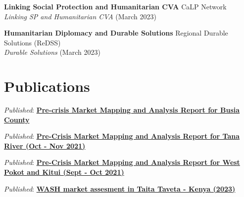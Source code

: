 \documentclass[line,margin,10pt]{res}
\begin{document}
\begin{resume}
\textbf{Linking Social Protection and Humanitarian CVA } \hfill CaLP Network\\
{\sl Linking SP and Humanitarian CVA} \hfill (March 2023)

\textbf{Humanitarian Diplomacy and Durable Solutions} \hfill Regional Durable Solutions (ReDSS)\\
{\sl Durable Solutions} \hfill (March 2023)

{\vspace{-0.25cm}}

\section{Publications}
{\sl Published}: \textbf{\href{https://reliefweb.int/node/3935263}{Pre-crisis Market Mapping and Analysis Report for Busia County}}

{\sl Published}: \textbf{\href{https://reliefweb.int/node/3928348}{Pre-Crisis Market Mapping and Analysis Report for Tana River (Oct - Nov 2021)}}

{\sl Published}: \textbf{\href{https://reliefweb.int/node/3928350}{Pre-Crisis Market Mapping and Analysis Report for West Pokot and Kitui (Sept - Oct 2021)}}

{\sl Published}: \textbf{\href{https://www.dropbox.com/s/qs9067pr9a9tok1/2023_WASH Market assessment Taveta report_final.pdf?dl=0}{WASH market assesment in Taita Taveta - Kenya (2023)}}

{\vspace{-0.25cm}}


\end{resume}
\end{document}
